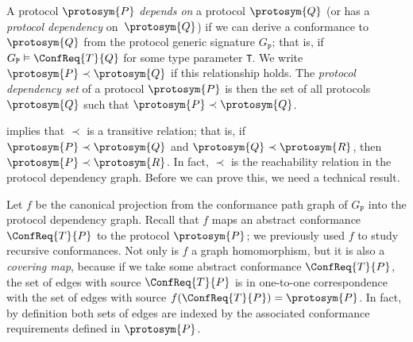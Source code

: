 \documentclass[../generics]{subfiles}
\begin{document}
\begin{definition}
A protocol $\protosym{P}$ \emph{depends on} a protocol $\protosym{Q}$ (or has a \emph{protocol dependency} on~$\protosym{Q}$) if we can derive a conformance to $\protosym{Q}$ from the protocol generic signature $G_\texttt{P}$; that is, if $G_\texttt{P}\vDash\ConfReq{T}{Q}$ for some type parameter \texttt{T}. We write $\protosym{P}\prec\protosym{Q}$ if this relationship holds. The \emph{protocol dependency set} of a protocol $\protosym{P}$ is then the set of all protocols $\protosym{Q}$ such that $\protosym{P}\prec\protosym{Q}$.
\end{definition}

 implies that $\prec$ is a transitive relation; that is, if $\protosym{P}\prec\protosym{Q}$ and $\protosym{Q}\prec\protosym{R}$, then $\protosym{P}\prec\protosym{R}$. In fact, $\prec$ is the reachability relation in the protocol dependency graph. Before we can prove this, we need a technical result.

\smallskip

Let $f$ be the canonical projection from the conformance path graph of $G_\texttt{P}$ into the protocol dependency graph. Recall that $f$ maps an abstract conformance $\ConfReq{T}{P}$ to the protocol $\protosym{P}$; we previously used $f$ to study recursive conformances. Not only is $f$ a graph homomorphism, but it is also a \emph{covering map}, because if we take some abstract conformance $\ConfReq{T}{P}$, the set of edges with source $\ConfReq{T}{P}$ is in one-to-one correspondence with the set of edges with source $f(\ConfReq{T}{P})=\protosym{P}$. In fact, by definition both sets of edges are indexed by the associated conformance requirements defined in $\protosym{P}$.
\end{document}
